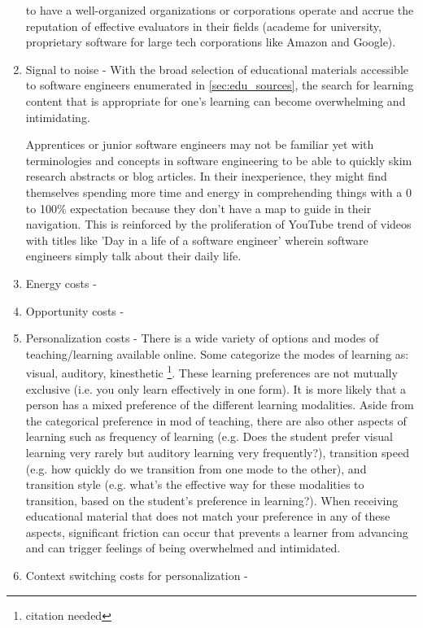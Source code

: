 \documentclass[journal, onecolumn]{IEEEtran}
\begin{document}
\begin{enumerate}
  to have a well-organized organizations or corporations operate and accrue the 
  reputation of effective evaluators in their fields (academe for university,
  proprietary software for large tech corporations like Amazon and Google).
  \item Signal to noise - With the broad selection of educational materials 
  accessible to software engineers enumerated in \ref{sec:edu_sources}, 
  the search for learning content that is appropriate for one's learning 
  can become overwhelming and intimidating. 
  
  Apprentices or junior software engineers may not be familiar yet with terminologies
  and concepts in software engineering to be able to quickly skim research abstracts or
  blog articles. In their inexperience, they might find themselves spending more time and
  energy in comprehending things with a 0 to 100\% expectation because they don't have a map to guide in 
  their navigation. This is reinforced by the proliferation of YouTube trend
  of videos with titles like 'Day in a life of a  software engineer' wherein
  software engineers simply talk about their daily life.
  \item Energy costs - 
  \item Opportunity costs - 
  \item Personalization costs - There is a wide variety of options and modes 
  of teaching/learning available online. Some categorize the modes of learning as:
  visual, auditory, kinesthetic \footnote{citation needed}. These learning 
  preferences are not mutually exclusive (i.e. you only learn effectively in one
  form). It is more likely that a person has a mixed preference of the different
  learning modalities. Aside from the categorical preference in mod of teaching, 
  there are also other aspects of learning such as frequency of learning (e.g. Does 
  the student prefer visual learning very rarely but auditory learning very frequently?),
  transition speed (e.g. how quickly do we transition from one mode to the other), and 
  transition style (e.g. what's the effective way for these modalities to transition, 
  based on the student's preference in learning?). 
  When receiving educational material that does not match your preference in any 
  of these aspects, significant friction can occur that prevents a learner from 
  advancing and can trigger feelings of being overwhelmed and intimidated. 
  \item Context switching costs for personalization - 
\end{enumerate}
\end{document}
